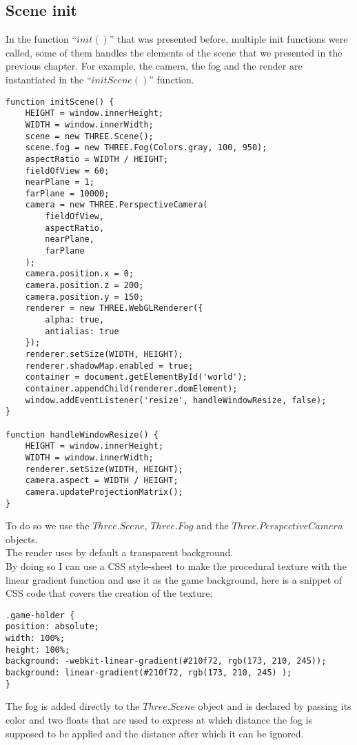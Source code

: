 \documentclass[a4paper,11pt]{article}
\begin{document}
\subsection{Scene init}
In the function ``$init()$'' that was presented before, multiple init functions were called, some of them handles the elements of the scene that we presented in the previous chapter.
For example, the camera, the fog and the render are instantiated in the ``$initScene()$'' function.
\begin{verbatim}
function initScene() {
    HEIGHT = window.innerHeight;
    WIDTH = window.innerWidth;
    scene = new THREE.Scene();
    scene.fog = new THREE.Fog(Colors.gray, 100, 950);
    aspectRatio = WIDTH / HEIGHT;
    fieldOfView = 60;
    nearPlane = 1;
    farPlane = 10000;
    camera = new THREE.PerspectiveCamera(
        fieldOfView,
        aspectRatio,
        nearPlane,
        farPlane
    );
    camera.position.x = 0;
    camera.position.z = 200;
    camera.position.y = 150;
    renderer = new THREE.WebGLRenderer({
        alpha: true,
        antialias: true
    });
    renderer.setSize(WIDTH, HEIGHT);
    renderer.shadowMap.enabled = true;
    container = document.getElementById('world');
    container.appendChild(renderer.domElement);
    window.addEventListener('resize', handleWindowResize, false);
}

function handleWindowResize() {
    HEIGHT = window.innerHeight;
    WIDTH = window.innerWidth;
    renderer.setSize(WIDTH, HEIGHT);
    camera.aspect = WIDTH / HEIGHT;
    camera.updateProjectionMatrix();
}

\end{verbatim}
To do so we use the $Three.Scene$, $Three.Fog$ and the $Three.PerspectiveCamera$ objects.\\
The render uses by default a transparent background.\\
By doing so I can use a CSS style-sheet to make the procedural texture with the linear gradient function and use it as the game background, here is a snippet of CSS code that covers the creation of the texture:
\begin{verbatim}
.game-holder {
position: absolute;
width: 100%;
height: 100%;
background: -webkit-linear-gradient(#210f72, rgb(173, 210, 245));
background: linear-gradient(#210f72, rgb(173, 210, 245) );
}
\end{verbatim}
The fog is added directly to the $Three.Scene$ object and is declared by passing its color and two floats that are used to express at which distance the fog is supposed to be applied and the distance after which it can be ignored.\\
\end{document}
